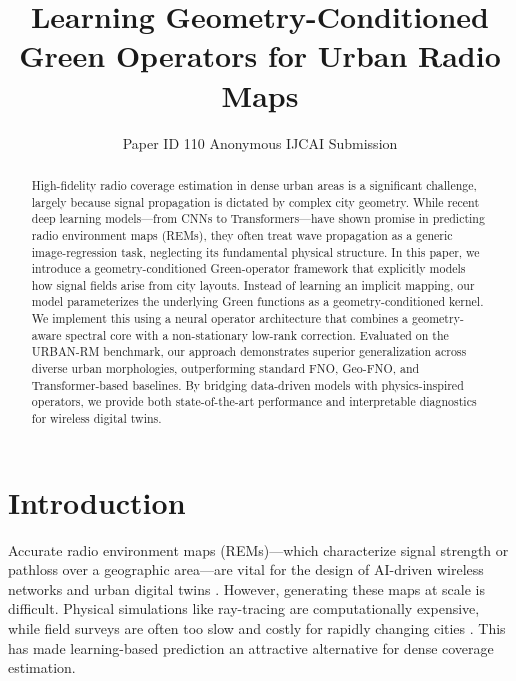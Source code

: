 \documentclass{article}
\title{Learning Geometry-Conditioned Green Operators for Urban Radio Maps}
\author{
    Paper ID 110
    \affiliations
    Anonymous IJCAI Submission
}
\begin{document}
\maketitle

\begin{abstract}
High-fidelity radio coverage estimation in dense urban areas is a significant challenge, largely because signal propagation is dictated by complex city geometry. While recent deep learning models—from CNNs to Transformers—have shown promise in predicting radio environment maps (REMs), they often treat wave propagation as a generic image-regression task, neglecting its fundamental physical structure. In this paper, we introduce a geometry-conditioned Green-operator framework that explicitly models how signal fields arise from city layouts. Instead of learning an implicit mapping, our model parameterizes the underlying Green functions as a geometry-conditioned kernel. We implement this using a neural operator architecture that combines a geometry-aware spectral core with a non-stationary low-rank correction. Evaluated on the URBAN-RM benchmark, our approach demonstrates superior generalization across diverse urban morphologies, outperforming standard FNO, Geo-FNO, and Transformer-based baselines. By bridging data-driven models with physics-inspired operators, we provide both state-of-the-art performance and interpretable diagnostics for wireless digital twins.
\end{abstract}


%
%
\section{Introduction}
\label{sec:intro}

Accurate radio environment maps (REMs)—which characterize signal strength or pathloss over a geographic area—are vital for the design of AI-driven wireless networks and urban digital twins \cite{zhang2022aiwireless,3gpp2023digitaltwin}. However, generating these maps at scale is difficult. Physical simulations like ray-tracing are computationally expensive, while field surveys are often too slow and costly for rapidly changing cities \cite{oliner2011modern}. This has made learning-based prediction an attractive alternative for dense coverage estimation.
\end{document}
